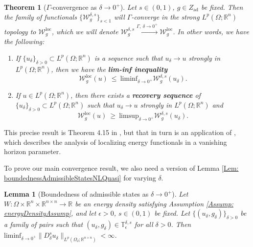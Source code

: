 \documentclass[11pt, reqno]{amsart}   	%
\theoremstyle{plain}
\numberwithin{equation}{section}
\newtheorem{theorem}[thm]{Theorem}
\newtheorem{lemma}[thm]{Lemma}
\def\de{\delta}
\def\ep{\epsilon}
\def\Ga{\Gamma}
\def\Om{\Omega}
\def\R{\mathbb{R}}
\def\liminf{\text{liminf}}
\def\limsup{\text{limsup}}
\def\loc{\text{loc}}
\begin{document}
 \begin{theorem}[$\Ga$-convergence as $\de \rightarrow 0^+$]\label{Thm: Gade->0: GaConv}
	Let $s \in (0, 1)$, $g \in Z_{\text{ad}}$ be fixed. Then the family of functionals $\{\mathcal{W}^{\de, s}_g\}_{s < 1}$ will $\Ga$-converge in the strong $L^p(\Om; \R^n)$ topology to $\mathcal{W}^{\loc}_g$, which we will denote $\mathcal{W}^{\de, s}_g \xrightarrow{\Ga, \ \de \rightarrow 0^+} \mathcal{W}^{\loc}_g$. In other words, we have the following:
	\begin{enumerate}[label=\textbf{GCs\arabic*}]
		\item\label{GCd1} If $\{u_{\de}\}_{\de > 0} \subset L^p(\Om; \R^n)$ is a sequence such that $u_{\de} \rightarrow u$ strongly in $L^p(\Om; \R^n)$, then we have the \textbf{lim-inf inequality}
		\begin{equation}\label{Gade->0Liminf}
			\mathcal{W}^{\loc}_g(u) \ \leq \ \liminf_{\de \rightarrow 0^+}\mathcal{W}^{\de, s}_g(u_{\de}).
		\end{equation}
		\item\label{GCd2} If $u \in L^p(\Om; \R^n)$, then there exists a \textbf{recovery sequence} of $\{u_{\de}\}_{\de > 0} \subset L^p(\Om; \R^n)$ such that $u_{\de} \rightarrow u$ strongly in $L^p(\Om; \R^n)$ and
		\begin{equation}\label{Gade->0Limsup}
			\mathcal{W}^{\loc}_g(u) \ \geq \ \limsup_{\de \rightarrow 0^+} \mathcal{W}^{\de, s}_g(u_{\de}).
		\end{equation}
	\end{enumerate}
\end{theorem}

This precise result is Theorem 4.15 in \cite{cueto2026localization}, but that in turn is an application of \cite[Theorem 3.7]{cueto2025gamma}, which describes the analysis of localizing energy functionals in a vanishing horizon parameter.

To prove our main convergence result, we also need a version of Lemma \ref{Lem: boundednessAdmissibleStatesNLQuasi} for varying $\de$. 

 \begin{lemma}[Boundedness of admissible states as $\de \rightarrow 0^+$]\label{Lem: boundednessAdmissibleStatesNLQuaside->0}
        Let $W: \Om \times \R^n \times \R^{n \times n} \rightarrow \R$ be an energy density satisfying Assumption \ref{Assump: energyDensityAssump}, and let $\ep > 0$, $s \in (0, 1)$ be fixed. Let $\{(u_{\de}, g_{\de})\}_{\de > 0}$ be a family of pairs such that $(u_{\de}, g_{\de}) \in \mathbb{T}^{\de, s}_{\ep}$ for all $\de > 0$. Then $\liminf_{\de \rightarrow 0^+}\|D^s_{\de}u_{\de}\|_{L^p(\Om_{\de}; \R^{n \times n})} < \infty$.
    \end{lemma}
    
\end{document}
